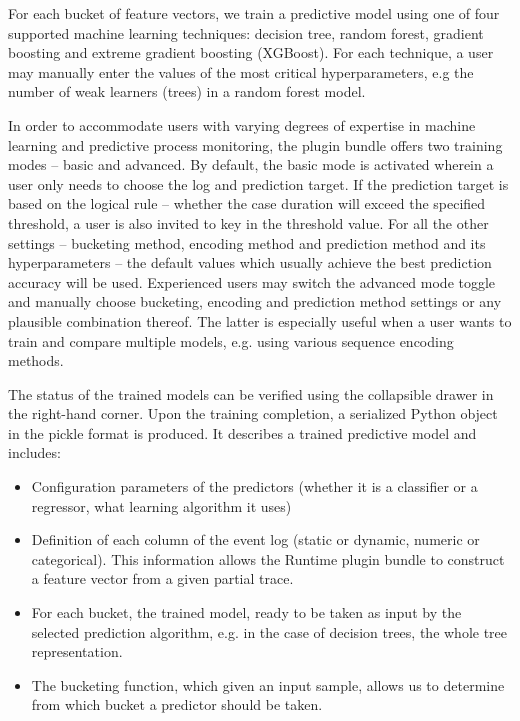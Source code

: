 \documentclass[runningheads,a4paper]{llncs}
\begin{document}
For each bucket of feature vectors, we train a predictive model using one of four supported machine learning techniques: decision tree, random forest, gradient boosting and extreme gradient boosting (XGBoost). For each technique, a user may manually enter the values of the most critical hyperparameters, e.g the number of weak learners (trees) in a random forest model.

In order to accommodate users with varying degrees of expertise in machine learning and predictive process monitoring, the plugin bundle offers two training modes -- basic and advanced. By default, the basic mode is activated wherein a user only needs to choose the log and prediction target. If the prediction target is based on the logical rule -- whether the case duration will exceed the specified threshold, a user is also invited to key in the threshold value. For all the other settings -- bucketing method, encoding method and prediction method and its hyperparameters -- the default values which usually achieve the best prediction accuracy will be used. Experienced users may switch the advanced mode toggle and manually choose bucketing, encoding and prediction method settings or any plausible combination thereof. The latter is especially useful when a user wants to train and compare multiple models, e.g. using various sequence encoding methods.

The status of the trained models can be verified using the collapsible drawer in the right-hand corner. Upon the training completion, a serialized Python object in the pickle format is produced. It describes a trained predictive model and includes:

\begin{itemize}
	\item Configuration parameters of the predictors (whether it is a classifier or a regressor, what learning algorithm it uses)
	\item Definition of each column of the event log (static or dynamic, numeric or categorical). This information allows the Runtime plugin bundle to construct a feature vector from a given partial trace.
	\item For each bucket, the trained model, ready to be taken as input by the selected prediction algorithm, e.g. in the case of decision trees, the whole tree representation.
	\item The bucketing function, which given an input sample, allows us to determine from which bucket a predictor should be taken.

\end{itemize}
\end{document}
